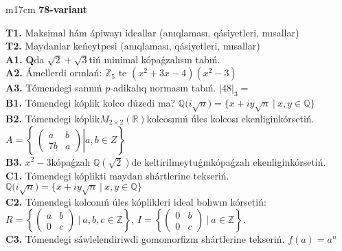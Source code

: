 \documentclass{article}
\begin{document}
\begin{tabular}{m{17cm}}
\textbf{78-variant}
\newline

\textbf{T1.} Maksimal hám ápiwayı ideallar (anıqlaması, qásiyetleri, mısallar) \\
\textbf{T2.} Maydanlar keńeytpesi (anıqlaması, qásiyetleri, mısallar) \\
\textbf{A1.} \(\mathbf{Q}\)da \(\sqrt{2} + \sqrt{3}\)tiń minimal kópaǵzalısın tabıń. \\
\textbf{A2.} Ámellerdi orınlań: \(\mathbb{Z}_{5}\) te \(\left( x^{2} + 3x - 4 \right)\left( x^{2} - 3 \right)\) \\
\textbf{A3.} Tómendegi sannıń \(p\)-adikalıq normasın tabıń. \(|48|_{3} =\) \\
\textbf{B1.} Tómendegi kóplik kolco dúzedi ma? \(\mathbb{Q(}i\sqrt{n}) = \{ x + iy\sqrt{n}\ |\ x,y \in \mathbb{Q}\}\) \\
\textbf{B2.} Tómendegi kóplik\(M_{2 \times 2}\left( \mathbb{R} \right)\)kolcosınıń úles kolcosı ekenliginkórsetiń. \(A = \left\{ \left. \ \begin{pmatrix}
a & b \\
7b & a
\end{pmatrix} \right|a,b \in Z \right\}\) \\
\textbf{B3.} \(x^{2} - 3\)kópaǵzalı \(\mathbb{Q}(\sqrt{2})\)de keltirilmeytuǵınkópaǵzalı ekenliginkórsetiń. \\
\textbf{C1.} Tómendegi kóplikti maydan shártlerine tekseriń. \(\mathbb{Q(}i\sqrt{n}) = \{ x + iy\sqrt{n}\ |\ x,y \in \mathbb{Q}\}\) \\
\textbf{C2.} Tómendegi kolconıń úles kóplikleri ideal bolıwın kórsetiń:
\(R = \left\{ \begin{pmatrix}
a & b \\
0 & c
\end{pmatrix}\ |\ a,b,c \in \mathbb{Z} \right\}\), \(I = \left\{ \begin{pmatrix}
0 & b \\
0 & c
\end{pmatrix}\ |\ a \in \mathbb{Z} \right\}\). \\
\textbf{C3.} Tómendegi sáwlelendiriwdi gomomorfizm shártlerine tekseriń. \(f(a) = a^{n}\) \\

\end{tabular}
\vspace{1cm}
\end{document}
